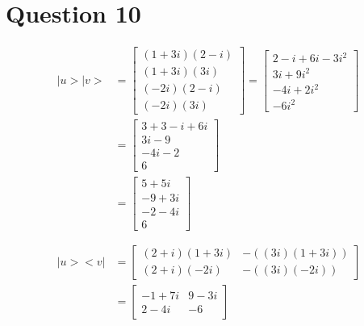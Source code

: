 \documentclass{article}
\begin{document}
\section{Question 10}
\begin{align*} 
    |u>|v> &= \begin{bmatrix}
    (1+3i)(2-i) \\ (1+3i)(3i) \\ (-2i)(2-i) \\ (-2i)(3i) 
    \end{bmatrix} 
    = 
    \begin{bmatrix}
    2 - i + 6i - 3i^2 \\ 3i + 9i^2 \\ -4i + 2i^2 \\ -6i^2
    \end{bmatrix} \\ &= 
    \begin{bmatrix}
    3 + 3 - i + 6i \\ 3i-9 \\ -4i-2 \\ 6
    \end{bmatrix} \\ &= \begin{bmatrix}
    5 + 5i \\ -9+3i \\ -2-4i \\ 6 
    \end{bmatrix} \\ \\ \\ 
    |u><v|& = \begin{bmatrix}
    (2+i)(1+3i) & -((3i)(1+3i)) \\ 
    (2+i)(-2i) & -((3i)(-2i)) \end{bmatrix} \\ 
    &= \begin{bmatrix}
    -1+7i & 9-3i \\ 2-4i & -6
    \end{bmatrix}
\end{align*} 
\end{document}
